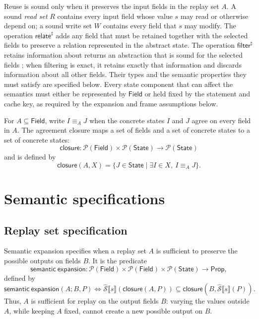 \documentclass[10pt]{article}
\newcommand{\REV}[1]{{\color{reviewpink}#1}}
\newcommand{\Field}{\mathsf{Field}}
\newcommand{\State}{\mathsf{State}}
\newcommand{\CollectingSemantics}[1]{\widehat{\mathcal S}\mathopen{⟦}#1\mathclose{⟧}}
\newcommand{\ProjClose}{\mathsf{closure}}
\newcommand{\filter}{\mathsf{filter}}
\newcommand{\relate}{\mathsf{relate}}
\newcommand{\SemanticExpand}{\mathsf{semantic\ expansion}}
\newcommand{\agree}[1]{\mathrel{\equiv_{#1}}}
\providecommand{\DIFaddtex}[1]{{\protect\color{blue} #1}} %
\providecommand{\DIFdeltex}[1]{{\protect\color{red} \scriptsize #1}} %
\providecommand{\DIFaddbegin}{} %
\providecommand{\DIFaddend}{} %
\providecommand{\DIFdelbegin}{} %
\providecommand{\DIFdelend}{} %
\providecommand{\DIFadd}[1]{\texorpdfstring{\DIFaddtex{#1}}{#1}} %
\providecommand{\DIFdel}[1]{\texorpdfstring{\DIFdeltex{#1}}{}} %
\begin{document}
Reuse is sound only when it preserves the input fields in the replay set \(A\). A sound
\emph{read set} \(R\) contains every input field whose value \(s\) may read or otherwise
depend on; a sound write set \(W\) contains every field that \(s\) may modify.
The operation \(\relate^\sharp\) adds any field that must be retained together with the selected
fields to preserve a relation represented in the abstract state. The operation \(\filter^\sharp\)
\DIFdelbegin \DIFdel{retains information about }\DIFdelend \DIFaddbegin \DIFadd{returns an abstraction that is sound for }\DIFaddend the selected fields\DIFaddbegin \DIFadd{; when filtering is exact, it retains
exactly that information }\DIFaddend and discards information about all other fields. Their types and the
semantic properties they must satisfy are specified below. \DIFaddbegin \DIFadd{Every state component that can affect
the semantics must either be represented by \(\Field\) or held fixed by the statement and cache
key, \REV{as required by the expansion and frame assumptions below.}
}\DIFaddend

For \(A\subseteq\Field\), write \(I\agree{A}J\) when the concrete states \(I\) and \(J\)
agree on every field in \(A\). The agreement closure maps a set of fields and a set of concrete
states to a set of concrete states:
\[
  \ProjClose:\mathcal P(\Field)\times\mathcal P(\State)
  \to\mathcal P(\State)
\]
and is defined by
\[
  \ProjClose(A,X)=\{J\in\State\mid \exists I\in X,\ I\agree{A}J\}.
\]

\section{Semantic specifications}

\subsection{Replay set specification}

Semantic expansion specifies when a replay set \(A\) is sufficient to preserve the possible
outputs on fields \(B\). It is the predicate
\[
  \SemanticExpand:
  \mathcal P(\Field)\times\mathcal P(\Field)\times\mathcal P(\State)
  \to\mathsf{Prop},
\]
defined by
\[
  \SemanticExpand(A;B,P)
  \Longleftrightarrow
  \CollectingSemantics{s}\!\left(\ProjClose(A,P)\right)
  \subseteq
  \ProjClose\!\left(B,\CollectingSemantics{s}(P)\right).
  \tag{SE}
\]
Thus, \(A\) is sufficient for replay on the output fields \(B\): varying the values outside
\(A\), while keeping \(A\) fixed, cannot create a new possible output on \(B\).
\end{document}
